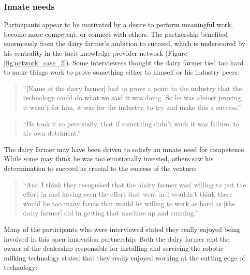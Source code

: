 \subsubsection{Innate needs}

Participants appear to be motivated by a desire to perform meaningful work, become more competent, or connect with others. The partnership benefited enormously from the dairy farmer's ambition to succeed, which is underscored by his centrality in the tacit knowledge provider network (Figure \ref{fig:network_case_2}). Some interviewees thought the dairy farmer tied too hard to make things work to prove something either to himself or his industry peers:

\begin{quote}
\small
\enquote{[Name of the dairy farmer] had to prove a point to the industry that the technology could do what we said it was doing. So he was almost proving, it wasn't for him, it was for the industry, to try and make this a success.} \\
\end{quote}

\begin{quote}
\small
\enquote{He took it so personally, that if something didn't work it was failure, to his own detriment.} \\
\end{quote}
 
The dairy farmer may have been driven to satisfy an innate need for competence. While some may think he was too emotionally invested, others saw his determination to succeed as crucial to the success of the venture:

\begin{quote}
\small
\enquote{And I think they recognised that the [dairy farmer was] willing to put the effort in and having seen the effort that went in I wouldn't think there would be too many farms that would be willing to work as hard as [the dairy farmer] did in getting that machine up and running.} \\
\end{quote}

Many of the participants who were interviewed stated they really enjoyed being involved in this open innovation partnership. Both the dairy farmer and the owner of the dealership responsible for installing and servicing the robotic milking technology stated that they really enjoyed working at the cutting edge of technology:


